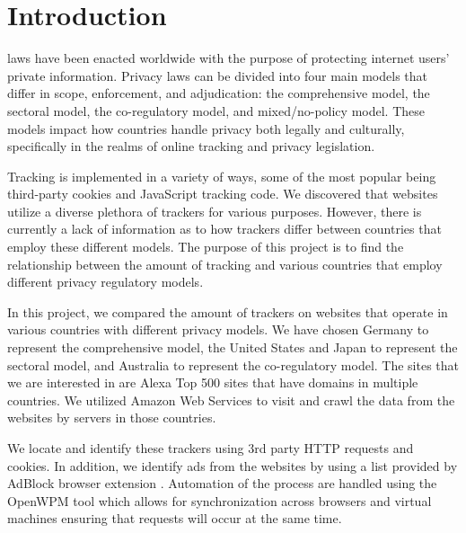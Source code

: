 \documentclass[journal]{IEEEtran}
\begin{document}
\section{Introduction}
% 
% 
% 
% 
laws have been enacted worldwide with the purpose of protecting internet users' private information. Privacy laws can be divided into four main models
 \cite{IAPPbook} that differ in scope, enforcement, and adjudication: the comprehensive model, the sectoral model, the co-regulatory model, and mixed/no-policy model. These models impact how countries handle privacy both legally and culturally, specifically in the realms of online tracking and privacy legislation. 

Tracking is implemented in a variety of ways, some of the most popular being third-party cookies and JavaScript tracking code. We discovered that websites utilize a diverse plethora of trackers for various purposes. However, there is currently a lack of information as to how trackers differ between countries that employ these different models. The purpose of this project is to find the relationship between the amount of tracking and various countries that employ different privacy regulatory models.

In this project, we compared the amount of trackers on websites that operate in various countries with different privacy models. We have chosen Germany to represent the comprehensive model, the United States and Japan to represent the sectoral model, and Australia to represent the co-regulatory model. The sites that we are interested in are Alexa Top 500 sites \cite{Alexa} that have domains in multiple countries. We utilized Amazon Web Services to visit and crawl the data from the websites by servers in those countries.


We locate and identify these trackers using 3rd party HTTP requests and cookies. In addition, we identify ads from the websites by using a list provided by AdBlock browser extension \cite{adblock}. Automation of the process are handled using the OpenWPM \cite{openwpm} tool which allows for synchronization across browsers and virtual machines ensuring that requests will occur at the same time. 
\end{document}
